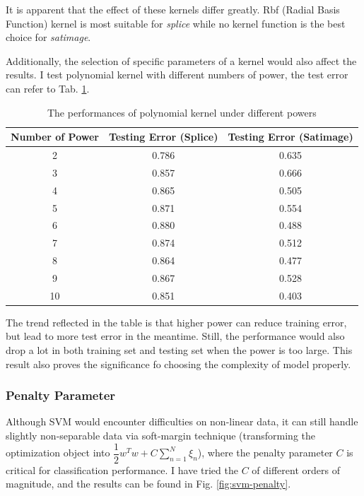 \documentclass[12pt,a4paper]{article}
\theoremstyle{definition}
\begin{document}
It is apparent that the effect of these kernels differ greatly. Rbf (Radial Basis Function) kernel is most suitable for \textit{splice} while no kernel function is the best choice for \textit{satimage}. 

\vspace{0.01\linewidth}
Additionally, the selection of specific parameters of a kernel would also affect the results. I test polynomial kernel with different numbers of power, the test error can refer to Tab. \ref{tab:kernel-poly}.

\begin{table}[H]
	\renewcommand\arraystretch{1.35}
	\caption{The performances of polynomial kernel under different powers}
	\label{tab:kernel-poly}
	\centering
	
	\begin{tabular}{c|c|c}
		\centering
		Number of Power & Testing Error (Splice) & Testing Error (Satimage) \\
		\hline
		
		2 & 0.786 & 0.635 \\
		3 & 0.857 & 0.666 \\
		4 & 0.865 & 0.505 \\
		5 & 0.871 & 0.554 \\
		6 & 0.880 & 0.488 \\
		7 & 0.874 & 0.512 \\
		8 & 0.864 & 0.477 \\
		9 & 0.867 & 0.528 \\
		10 & 0.851 & 0.403 \\
	\end{tabular}
\end{table}

The trend reflected in the table is that higher power can reduce training error, but lead to more test error in the meantime. Still, the performance would also drop a lot in both training set and testing set when the power is too large. This result also proves the significance fo choosing the complexity of model properly.

\subsubsection{Penalty Parameter}

Although SVM would encounter difficulties on non-linear data, it can still handle slightly non-separable data via soft-margin technique (transforming the optimization object into $\dfrac{1}{2}w^Tw+C\sum\limits_{n=1}^{N}\xi_n$), where the penalty parameter $C$ is critical for classification performance. I have tried the $C$ of different orders of magnitude, and the results can be found in Fig. \ref{fig:svm-penalty}.
\end{document}

